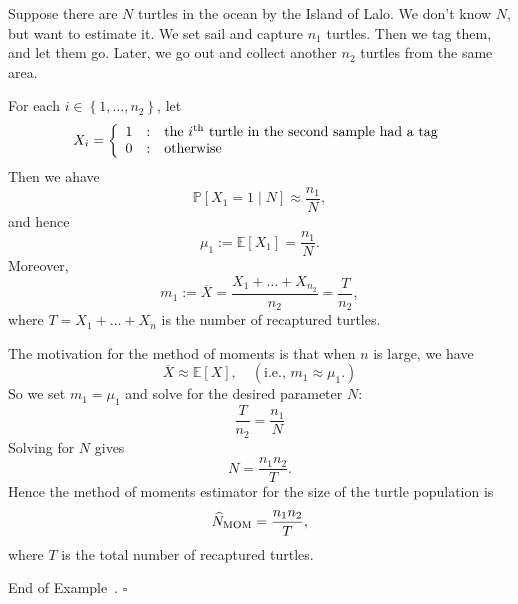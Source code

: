 \documentclass[10pt]{article}
\theoremstyle{definition}
\newtheorem{example}[theorem]{Example}
\renewenvironment{example}
{\begin{oldexample}}
  {\par\smallskip\hfill   End of Example~\theexample. $\square$    \par\end{oldexample}}
\newcommand{\1}[1]{\textbf{1}_{\left[#1\right]}} %
\def\E{\mathbb{E}} %
\def\P{\mathbb{P}} %
\begin{document}
\begin{example}[Mark-and-recapture]
  \label{ex:mark-and-recapture}
  Suppose there are $N$ turtles in the ocean by the Island of Lalo. We don't
  know $N$, but want to estimate it. We set sail and capture $n_{1}$ turtles.
  Then we tag them, and let them go. Later, we go out and collect another
  $n_{2}$ turtles from the same area.

  For each $i\in \left\{1,\ldots,n_{2}\right\}$, let
  \begin{equation*}
    X_{i} = \left\{ \begin{array}{l@{\quad:\quad}l} 1 & \text{the $i^{\rm th}$ turtle in the second sample had a tag}\\ 0& \text{otherwise} \end{array}\right.
  \end{equation*}
  Then we ahave
  \begin{equation*}
    \P\left[X_{1}=1\mid N \right] \approx \frac{n_{1}}{N},
  \end{equation*}
  and hence
  \begin{equation*}
    \mu_{1} := \E\left[X_{1} \right] = \frac{n_{1}}{N}.
  \end{equation*}
  Moreover,
  \begin{equation*}
    m_{1} := \overline{X} = \frac{X_{1}+\ldots+X_{n_{2}}}{n_{2}} = \frac{T}{n_{2}},
  \end{equation*}
  where $T= X_{1}+\ldots+X_{n}$ is the number of recaptured turtles.

  The motivation for the method of moments is that when $n$ is large, we have
  \begin{equation*}
    \overline{X} \approx \E\left[X \right], \quad (\text{i.e., } m_{1}\approx \mu_{1}.)
  \end{equation*}
  So we set $m_{1} = \mu_{1}$ and solve for the desired parameter $N$:
  \begin{equation*}
    \frac{T}{n_{2}} = \frac{n_{1}}{N}
  \end{equation*}
  Solving for $N$ gives
  \begin{equation*}
    N = \frac{n_{1}n_{2}}{T}.
  \end{equation*}
  Hence the method of moments estimator for the size of the turtle population
  is
  \begin{equation*}
    \widehat{N}_{\rm MOM} = \frac{n_{1}n_{2}}{T},
  \end{equation*}
  where $T$ is the total number of recaptured turtles. 


\end{example}
\end{document}
